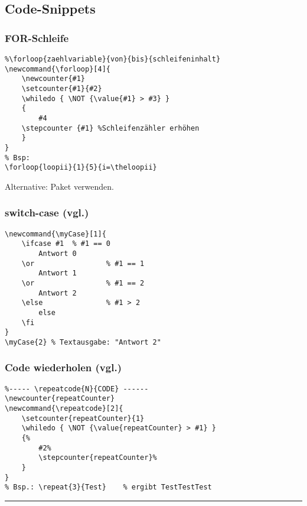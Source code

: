 \subsection{Code-Snippets}

\subsubsection[FOR-Schleife]{FOR-Schleife }
\negAbstand
\begin{lstlisting}
%\forloop{zaehlvariable}{von}{bis}{schleifeninhalt}
\newcommand{\forloop}[4]{
	\newcounter{#1}
	\setcounter{#1}{#2}
	\whiledo { \NOT {\value{#1} > #3} }
	{
		#4
	\stepcounter {#1} %Schleifenzähler erhöhen
	}
}
% Bsp:
\forloop{loopii}{1}{5}{i=\theloopii}
\end{lstlisting}
Alternative: Paket  verwenden.

\subsubsection[switch-case]{switch-case (vgl.\cite{Posp08})}
\negAbstand
\begin{lstlisting}
\newcommand{\myCase}[1]{
	\ifcase #1 	% #1 == 0
		Antwort 0
	\or 				% #1 == 1
		Antwort 1
	\or 				% #1 == 2
		Antwort 2
	\else				% #1 > 2
		else
	\fi
}
\myCase{2} % Textausgabe: "Antwort 2"
\end{lstlisting}
\subsubsection[Code wiederholen]{Code wiederholen (vgl.\cite{Posp08})}
\negAbstand
\begin{lstlisting}
%----- \repeatcode{N}{CODE} ------
\newcounter{repeatCounter}
\newcommand{\repeatcode}[2]{ 
	\setcounter{repeatCounter}{1}
	\whiledo { \NOT {\value{repeatCounter} > #1} }
	{%
		#2%
		\stepcounter{repeatCounter}%
	}
}	
% Bsp.: \repeat{3}{Test}	% ergibt TestTestTest
\end{lstlisting}

\hrule \vspace{0.5\baselineskip}
